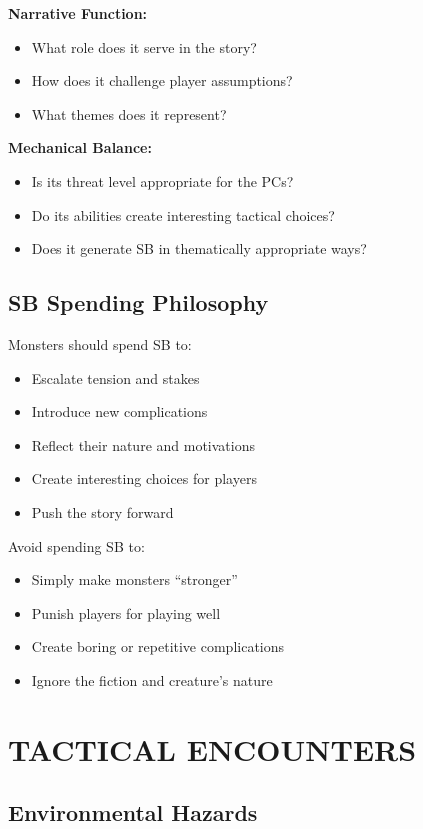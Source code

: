 \documentclass[12pt]{article}
\begin{document}
\begin{itemize}
\textbf{Narrative Function:}
\begin{itemize}
\item What role does it serve in the story?
\item How does it challenge player assumptions?
\item What themes does it represent?
\end{itemize}

\textbf{Mechanical Balance:}
\begin{itemize}
\item Is its threat level appropriate for the PCs?
\item Do its abilities create interesting tactical choices?
\item Does it generate SB in thematically appropriate ways?
\end{itemize}

\subsection*{SB Spending Philosophy}

Monsters should spend SB to:
\begin{itemize}
\item Escalate tension and stakes
\item Introduce new complications
\item Reflect their nature and motivations
\item Create interesting choices for players
\item Push the story forward
\end{itemize}

Avoid spending SB to:
\begin{itemize}
\item Simply make monsters ``stronger''
\item Punish players for playing well
\item Create boring or repetitive complications
\item Ignore the fiction and creature's nature
\end{itemize}

\section{TACTICAL ENCOUNTERS}

\subsection*{Environmental Hazards}


\end{itemize}
\end{document}
